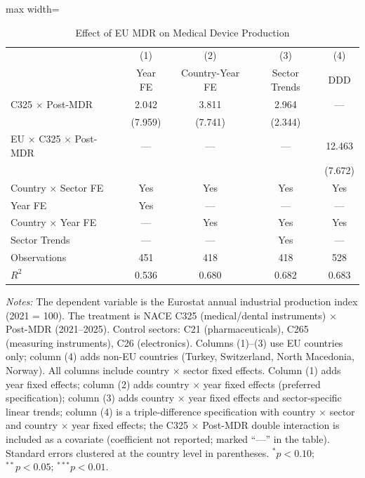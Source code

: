 \begin{table}[htbp]
\centering
\caption{Effect of EU MDR on Medical Device Production}
\label{tab:main_results}
\begin{adjustbox}{max width=\textwidth}
\begin{tabular}{lcccc}
\toprule
 & (1) & (2) & (3) & (4) \\
 & Year FE & Country-Year FE & Sector Trends & DDD \\
\midrule
C325 $\times$ Post-MDR & 2.042 & 3.811 & 2.964 & --- \\
 & (7.959) & (7.741) & (2.344) & \\
EU $\times$ C325 $\times$ Post-MDR & --- & --- & --- & 12.463 \\
 & & & & (7.672) \\
\midrule
Country $\times$ Sector FE & Yes & Yes & Yes & Yes \\
Year FE & Yes & --- & --- & --- \\
Country $\times$ Year FE & --- & Yes & Yes & Yes \\
Sector Trends & --- & --- & Yes & --- \\
Observations & 451 & 418 & 418 & 528 \\
$R^2$ & 0.536 & 0.680 & 0.682 & 0.683 \\
\bottomrule
\end{tabular}
\end{adjustbox}
\parbox{\textwidth}{\footnotesize \textit{Notes:} The dependent variable is the Eurostat annual industrial production index (2021 = 100). The treatment is NACE C325 (medical/dental instruments) $\times$ Post-MDR (2021--2025). Control sectors: C21 (pharmaceuticals), C265 (measuring instruments), C26 (electronics). Columns (1)--(3) use EU countries only; column (4) adds non-EU countries (Turkey, Switzerland, North Macedonia, Norway). All columns include country $\times$ sector fixed effects. Column (1) adds year fixed effects; column (2) adds country $\times$ year fixed effects (preferred specification); column (3) adds country $\times$ year fixed effects and sector-specific linear trends; column (4) is a triple-difference specification with country $\times$ sector and country $\times$ year fixed effects; the C325 $\times$ Post-MDR double interaction is included as a covariate (coefficient not reported; marked ``---'' in the table). Standard errors clustered at the country level in parentheses. $^{*}p<0.10$; $^{**}p<0.05$; $^{***}p<0.01$.}
\end{table}

